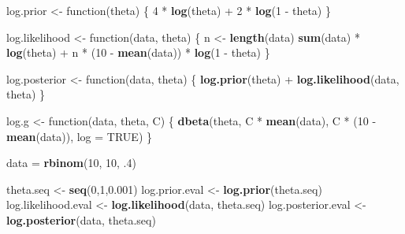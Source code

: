 \documentclass[]{article}
\newenvironment{Shaded}{\begin{snugshade}}{\end{snugshade}}
\newcommand{\KeywordTok}[1]{\textcolor[rgb]{0.13,0.29,0.53}{\textbf{{#1}}}}
\newcommand{\DataTypeTok}[1]{\textcolor[rgb]{0.13,0.29,0.53}{{#1}}}
\newcommand{\DecValTok}[1]{\textcolor[rgb]{0.00,0.00,0.81}{{#1}}}
\newcommand{\FloatTok}[1]{\textcolor[rgb]{0.00,0.00,0.81}{{#1}}}
\newcommand{\StringTok}[1]{\textcolor[rgb]{0.31,0.60,0.02}{{#1}}}
\newcommand{\OtherTok}[1]{\textcolor[rgb]{0.56,0.35,0.01}{{#1}}}
\newcommand{\NormalTok}[1]{{#1}}
\begin{document}
\begin{Shaded}
\begin{Highlighting}[]
\NormalTok{log.prior <-}\StringTok{  }\NormalTok{function(theta) \{}
  \DecValTok{4} \NormalTok{*}\StringTok{ }\KeywordTok{log}\NormalTok{(theta) +}\StringTok{ }\DecValTok{2} \NormalTok{*}\StringTok{ }\KeywordTok{log}\NormalTok{(}\DecValTok{1} \NormalTok{-}\StringTok{ }\NormalTok{theta)}
\NormalTok{\}}

\NormalTok{log.likelihood <-}\StringTok{  }\NormalTok{function(data, theta) \{}
  \NormalTok{n <-}\StringTok{ }\KeywordTok{length}\NormalTok{(data)}
  \KeywordTok{sum}\NormalTok{(data) *}\StringTok{ }\KeywordTok{log}\NormalTok{(theta) +}\StringTok{ }\NormalTok{n *}\StringTok{ }\NormalTok{(}\DecValTok{10} \NormalTok{-}\StringTok{ }\KeywordTok{mean}\NormalTok{(data)) *}\StringTok{ }\KeywordTok{log}\NormalTok{(}\DecValTok{1} \NormalTok{-}\StringTok{ }\NormalTok{theta)}
\NormalTok{\}}

\NormalTok{log.posterior <-}\StringTok{  }\NormalTok{function(data, theta) \{}
  \KeywordTok{log.prior}\NormalTok{(theta) +}\StringTok{ }\KeywordTok{log.likelihood}\NormalTok{(data, theta)}
\NormalTok{\}}

\NormalTok{log.g <-}\StringTok{ }\NormalTok{function(data, theta, C) \{}
   \KeywordTok{dbeta}\NormalTok{(theta, C *}\StringTok{ }\KeywordTok{mean}\NormalTok{(data), C *}\StringTok{ }\NormalTok{(}\DecValTok{10} \NormalTok{-}\StringTok{ }\KeywordTok{mean}\NormalTok{(data)), }\DataTypeTok{log =} \OtherTok{TRUE}\NormalTok{)}
\NormalTok{\}}

\NormalTok{data =}\StringTok{ }\KeywordTok{rbinom}\NormalTok{(}\DecValTok{10}\NormalTok{, }\DecValTok{10}\NormalTok{, .}\DecValTok{4}\NormalTok{)}

\NormalTok{theta.seq <-}\StringTok{ }\KeywordTok{seq}\NormalTok{(}\DecValTok{0}\NormalTok{,}\DecValTok{1}\NormalTok{,}\FloatTok{0.001}\NormalTok{)}
\NormalTok{log.prior.eval <-}\StringTok{ }\KeywordTok{log.prior}\NormalTok{(theta.seq)}
\NormalTok{log.likelihood.eval <-}\StringTok{ }\KeywordTok{log.likelihood}\NormalTok{(data, theta.seq)}
\NormalTok{log.posterior.eval <-}\StringTok{ }\KeywordTok{log.posterior}\NormalTok{(data, theta.seq)}


\end{Highlighting}
\end{Shaded}
\end{document}

